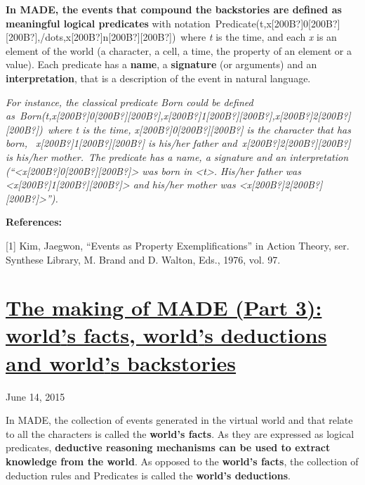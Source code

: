 \documentclass[a4paper]{article}
\newcommand\textstyleStrongEmphasis[1]{\textbf{#1}}
\newcommand\textstyleEmphasis[1]{\textit{#1}}
\begin{document}
\textstyleStrongEmphasis{In MADE, the events that compound the
backstories are defined as meaningful logical predicates} with
notation~Predicate(t,x[200B?]0[200B?][200B?],/dots,x[200B?]n[200B?][200B?])~where
\textstyleEmphasis{t} is the time, and each \textstyleEmphasis{x} is an
element of the world (a character, a cell, a time, the property of an
element or a value). Each predicate has a
\textstyleStrongEmphasis{name}, a \textstyleStrongEmphasis{signature}
(or arguments) and an \textstyleStrongEmphasis{interpretation}, that is
a description of the event in natural language.

\textstyleEmphasis{For instance, the classical predicate Born could be
defined
as~Born(t,x[200B?]0[200B?][200B?],x[200B?]1[200B?][200B?],x[200B?]2[200B?][200B?])~where
t is the time, x[200B?]0[200B?][200B?] is the character that has born,
~x[200B?]1[200B?][200B?] is his/her father and~x[200B?]2[200B?][200B?]
is his/her mother.~The predicate has a name, a signature and an
interpretation
({\textquotedblleft}{\textless}x[200B?]0[200B?][200B?]{\textgreater}
was born in {\textless}t{\textgreater}. His/her father was
{\textless}x[200B?]1[200B?][200B?]{\textgreater} and his/her mother was
{\textless}x[200B?]2[200B?][200B?]{\textgreater}{\textquotedblright}).}

{\bfseries
References:}

[1] Kim, Jaegwon, {\textquotedblleft}Events as Property
Exemplifications{\textquotedblright} in Action Theory, ser. Synthese
Library, M. Brand and D. Walton, Eds., 1976, vol. 97.


\bigskip

\clearpage\section[The making of MADE (Part 3): world{\textquoteright}s
facts, world{\textquoteright}s deductions and world{\textquoteright}s
backstories]{\href{http://www.velonuboso.com/made/2015/06/14/making-part-3-worlds-facts-worlds-deductions-worlds-backstories/}{The
making of MADE (Part 3): world{\textquoteright}s facts,
world{\textquoteright}s deductions and world{\textquoteright}s
backstories}}
June 14, 2015

In MADE, the collection of events generated in the virtual world and
that relate to all the characters is called the
\textstyleStrongEmphasis{world{\textquoteright}s facts}. As they are
expressed as logical predicates, \textstyleStrongEmphasis{deductive
reasoning mechanisms can be used to extract knowledge from the world}.
As opposed to the \textstyleStrongEmphasis{world{\textquoteright}s
facts}, the collection of deduction rules and Predicates is called the
\textstyleStrongEmphasis{world{\textquoteright}s deductions}.
\end{document}
